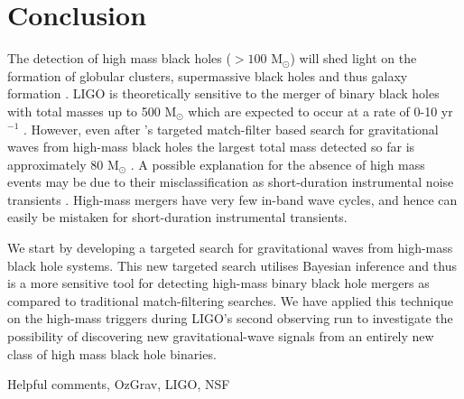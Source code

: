 \documentclass[%
 reprint,
 amsmath,amssymb,
 aps,
]{revtex4}
\begin{document}
\section{\label{sec:Conclusion}Conclusion}
The detection of high mass black holes (\(>100\) M\({}_\odot\)) will shed light on the formation of globular clusters,
supermassive black holes and thus galaxy formation \citep{lodato2006supermassive, 2018IMBHreview}. LIGO is theoretically
sensitive to the merger of binary black holes with total masses up to 500 M\({}_\odot\) which are expected to occur at a
rate of 0-10 yr\(^{-1}\) \citep[\citet{mandel2008rates}]{fregeau2006imbhbRatePrediction}. However, even after \citet{salemi2019search}'s
targeted match-filter based search for gravitational waves from high-mass black holes the largest total mass detected so
far is approximately 80 M\({}_\odot\) \citep{abbott2019gwtc}. A possible explanation for the absence of high mass events may be
due to their misclassification as short-duration instrumental noise transients \citep{blipGlitches}. High-mass mergers have
very few in-band wave cycles, and hence can easily be mistaken for short-duration instrumental transients. 

We start by developing a targeted search for gravitational waves from high-mass black hole systems. This new targeted
search utilises Bayesian inference and thus is a more sensitive tool for detecting high-mass binary black hole mergers
as compared to traditional match-filtering searches. We have applied this technique on the high-mass triggers during
LIGO's second observing run to investigate the possibility of discovering new gravitational-wave signals from an
entirely new class of high mass black hole binaries.

\begin{acknowledgments}
Helpful comments, OzGrav, LIGO, NSF

\end{acknowledgments}



\end{document}
